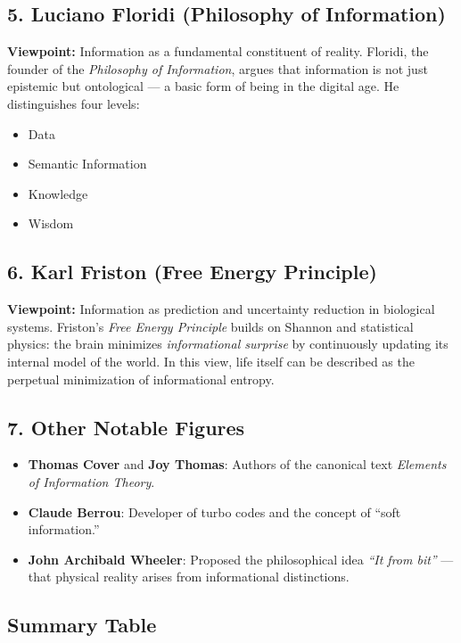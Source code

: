     \subsection*{5. Luciano Floridi (Philosophy of Information)}
        \textbf{Viewpoint:} Information as a fundamental constituent of reality.
        Floridi, the founder of the \textit{Philosophy of Information}, argues that information is not just epistemic but ontological —
        a basic form of being in the digital age.
        He distinguishes four levels:
        \begin{itemize}
            \item Data
            \item Semantic Information
            \item Knowledge
            \item Wisdom
        \end{itemize}
    
    \subsection*{6. Karl Friston (Free Energy Principle)}
        \textbf{Viewpoint:} Information as prediction and uncertainty reduction in biological systems.
        Friston’s \textit{Free Energy Principle} builds on Shannon and statistical physics:
        the brain minimizes \emph{informational surprise} by continuously updating its internal model of the world.
        In this view, life itself can be described as the perpetual minimization of informational entropy.
    
    \subsection*{7. Other Notable Figures}
        \begin{itemize}
            \item \textbf{Thomas Cover} and \textbf{Joy Thomas}: Authors of the canonical text \textit{Elements of Information Theory}.
            \item \textbf{Claude Berrou}: Developer of turbo codes and the concept of ``soft information.''
            \item \textbf{John Archibald Wheeler}: Proposed the philosophical idea \textit{``It from bit''} — that physical reality arises from informational distinctions.
        \end{itemize}
    
    \subsection*{Summary Table}
        
